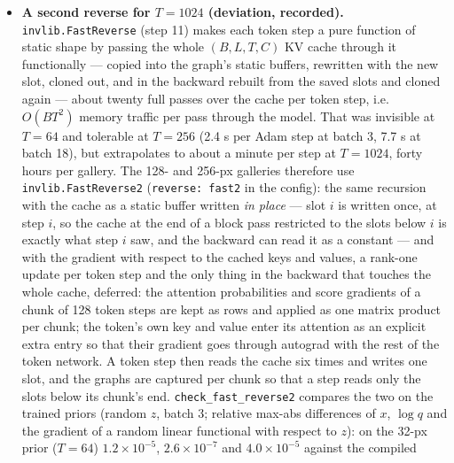 \documentclass[11pt]{article}
\begin{document}
\begin{itemize}
        model window (so $0.05 = 35$ HU and $0.25 = 175$ HU): the pixel
        mask, $2\times 2$ or $4 \times 4$ average pooling, and the
        pixel-driven Radon transform of \texttt{measlib.radon\_matrix} with
        $\lceil N\sqrt2\rceil$ detector bins (odd) over 180$^\circ$.
  \item \textbf{A second reverse for $T = 1024$ (deviation, recorded).}
        \texttt{invlib.FastReverse} (step 11) makes each token step a pure
        function of static shape by passing the whole $(B, L, T, C)$ KV
        cache through it functionally --- copied into the graph's static
        buffers, rewritten with the new slot, cloned out, and in the backward
        rebuilt from the saved slots and cloned again --- about twenty full
        passes over the cache per token step, i.e.\ $O(BT^{2})$ memory
        traffic per pass through the model. That was invisible at $T = 64$
        and tolerable at $T = 256$ (2.4 s per Adam step at batch 3, 7.7 s
        at batch 18), but extrapolates to about a minute per step at $T =
        1024$, forty hours per gallery. The 128- and 256-px galleries
        therefore use \texttt{invlib.FastReverse2} (\texttt{reverse: fast2}
        in the config): the same recursion with the cache as a static
        buffer written \emph{in place} --- slot $i$ is written once, at step
        $i$, so the cache at the end of a block pass restricted to the slots
        below $i$ is exactly what step $i$ saw, and the backward can read it
        as a constant --- and with the gradient with respect to the cached
        keys and values, a rank-one update per token step and the only
        thing in the backward that touches the whole cache, deferred: the
        attention probabilities and score gradients of a chunk of 128 token
        steps are kept as rows and applied as one matrix product per chunk;
        the token's own key and value enter its attention as an explicit
        extra entry so that their gradient goes through autograd with the
        rest of the token network. A token step then reads the cache six
        times and writes one slot, and the graphs are captured per chunk so
        that a step reads only the slots below its chunk's end.
        \texttt{check\_fast\_reverse2} compares the two on the trained
        priors (random $z$, batch 3; relative max-abs differences of $x$,
        $\log q$ and the gradient of a random linear functional with
        respect to $z$): on the 32-px prior ($T = 64$) $1.2 \times 10^{-5}$,
        $2.6 \times 10^{-7}$ and $4.0 \times 10^{-5}$ against the compiled

\end{itemize}
\end{document}
